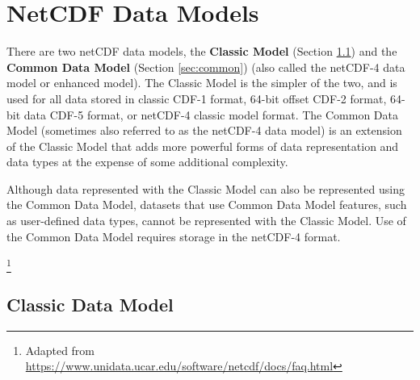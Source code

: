 \section{NetCDF Data Models}

{\itshape

There are two netCDF data models, the \textbf{Classic Model} (Section \ref{sec:classic}) and the \textbf{Common Data Model} (Section \ref{sec:common}) (also called the netCDF-4 data model or enhanced model).
The Classic Model is the simpler of the two, and is used for all data stored in classic CDF-1 format, 64-bit offset CDF-2 format, 64-bit data CDF-5 format, or netCDF-4 classic model format.
The Common Data Model (sometimes also referred to as the netCDF-4 data model) is an extension of the Classic Model that adds more powerful forms of data representation and data types at the expense of some additional complexity.

Although data represented with the Classic Model can also be represented using the Common Data Model, datasets that use Common Data Model features, such as user-defined data types, cannot be represented with the Classic Model. Use of the Common Data Model requires storage in the netCDF-4 format.
}\footnote{Adapted from \url{https://www.unidata.ucar.edu/software/netcdf/docs/faq.html}}

\subsection{Classic Data Model}
\label{sec:classic}

